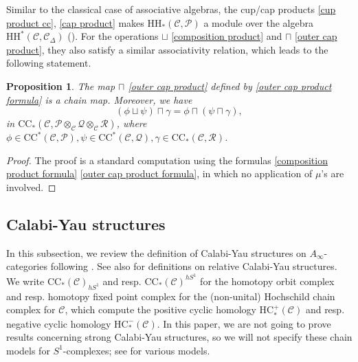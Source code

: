\documentclass[11pt]{amsproc}
\def\cP{\mathcal{P}}
\def\cQ{\mathcal{Q}}
\def\cR{\mathcal{R}}
\def\cc{\mathcal{C}}
\def\r#1{\mathrm{#1}}
\def\D{\Delta}
\def\ainf{A_\infty}
\newtheorem{prop}[lem]{Proposition}
\theoremstyle{remark}
\numberwithin{equation}{section}
\begin{document}
Similar to the classical case of associative algebras, 
the cup/cap products \eqref{cup product cc}, \eqref{cap product} makes $\r{HH}_{*}(\cc, \cP)$ a module over the algebra $\r{HH}^{*}(\cc, \cc_{\D})$ (\cite[Proposition 2.4]{ganatra}).
For the operations $\sqcup$ \eqref{composition product} and $\sqcap$ \eqref{outer cap product}, 
they also satisfy a similar associativity relation, 
which leads to the following statement. 

\begin{prop}\label{prop: outer cap product chain map}
The map $\sqcap$ \eqref{outer cap product} defined by \eqref{outer cap product formula} is a chain map.
Moreover, we have
\begin{equation}\label{cup cap compatible}
 (\phi \sqcup \psi) \sqcap \gamma = \phi \sqcap (\psi \sqcap \gamma),
\end{equation}
in $\r{CC}_{*}(\cc, \cP \otimes_{\cc} \cQ \otimes_{\cc} \cR)$,
where $\phi \in \r{CC}^{*}(\cc, \cP), \psi \in \r{CC}^{*}(\cc, \cQ), \gamma \in \r{CC}_{*}(\cc, \cR)$.
\end{prop}
\begin{proof}
The proof is a standard computation using the formulas \eqref{composition product formula} \eqref{outer cap product formula},
in which no application of $\mu$'s are involved.
\end{proof}

\subsection{Calabi-Yau structures}\label{section: cy structures}

In this subsection, we review the definition of Calabi-Yau structures on $\ainf$-categories following \cite{kontsevich-soibelman}. 
See also \cite{brav-dyckerhoff} for definitions on relative Calabi-Yau structures.
We write $\r{CC}_{*}(\cc)_{hS^{1}}$ and resp. $\r{CC}_{*}(\cc)^{hS^{1}}$ for the homotopy orbit complex and resp. homotopy fixed point complex for the (non-unital) Hochschild chain complex for $\cc$,
which compute the positive cyclic homology $\r{HC}_{*}^{+}(\cc)$ and resp. negative cyclic homology $\r{HC}_{*}^{-}(\cc)$.
In this paper, we are not going to prove results concerning strong Calabi-Yau structures,
so we will not specify these chain models for $S^{1}$-complexes;
see \cite{Bourgeois-Oancea, dotsenko-shadrin-vallette, ganatra_cyclic, zhao} for various models.
\end{document}
